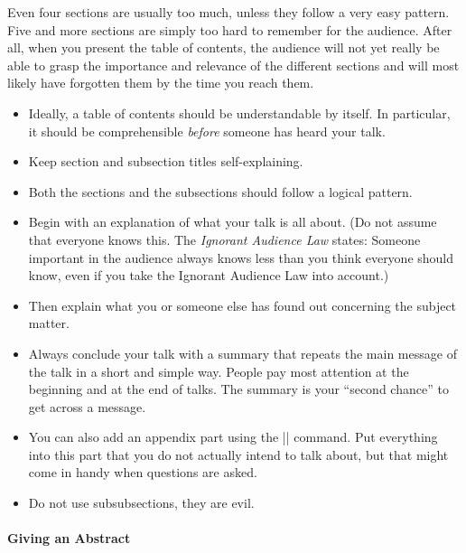 Even four sections are usually too much, unless they follow a very easy pattern. Five and more sections are simply too hard to remember for the audience. After all, when you present the table of contents, the audience will not yet really be able to grasp the importance and relevance of the different sections and will most likely have forgotten them by the time you reach them.
\begin{itemize}
\item
  Ideally, a table of contents should be understandable by itself. In particular, it should be comprehensible \emph{before} someone has heard your talk.
\item
  Keep section and subsection titles self-explaining.
\item
  Both the sections and the subsections should follow a logical pattern.
\item
  Begin with an explanation of what your talk is all about. (Do not assume that everyone knows this. The \emph{Ignorant Audience Law} states: Someone important in the audience always knows less than you think everyone should know, even if you take the Ignorant Audience Law into account.)
\item
  Then explain what you or someone else has found out concerning the subject matter.
\item
  Always conclude your talk with a summary that repeats the main message of the talk in a short and simple way. People pay most attention at the beginning and at the end of talks. The summary is your ``second chance'' to get across a message.
\item
  You can also add an appendix part using the |\appendix| command. Put everything into this part that you do not actually intend to talk about, but that might come in handy when questions are asked.
\item
  Do not use subsubsections, they are evil.
\end{itemize}

\paragraph{Giving an Abstract}

